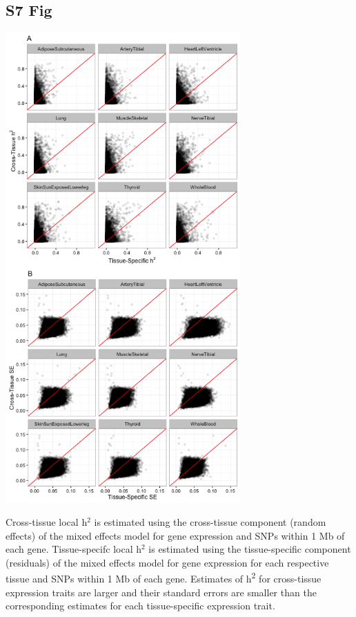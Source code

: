 \documentclass[10pt,letterpaper]{article}
\begin{document}
\begin{singlespace}
\subsection*{S7 Fig}
\includegraphics[width=9cm]{Figures/GenArch_Supp/S6Fig.png}
\label{S7_Fig}

 Cross-tissue local h$^2$ is estimated using the cross-tissue component (random effects) of the mixed effects model for gene expression and SNPs within 1 Mb of each gene. Tissue-specifc local h$^2$ is estimated using the tissue-specific component (residuals) of the mixed effects model for gene expression for each respective tissue and SNPs within 1 Mb of each gene. Estimates of h\textsuperscript{2} for cross-tissue expression traits are larger and their standard errors are smaller than the corresponding estimates for each tissue-specific expression trait.


\end{singlespace}
\end{document}
